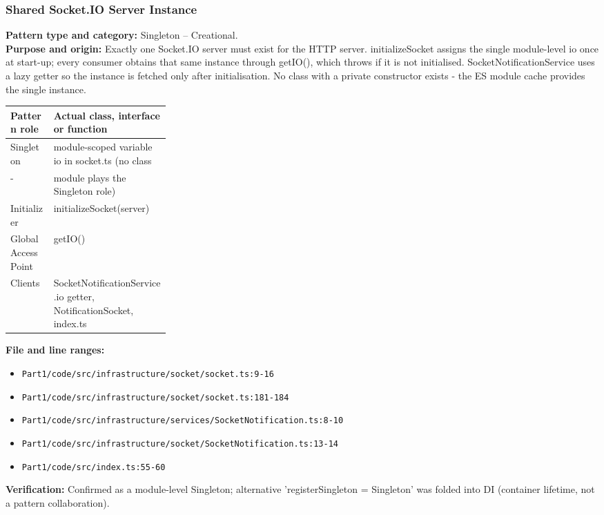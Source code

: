 \documentclass[11pt,a4paper]{article}
\begin{document}
\subsubsection*{Shared Socket.IO Server Instance}
\textbf{Pattern type and category:} Singleton -- Creational.\\
\textbf{Purpose and origin:} Exactly one Socket.IO server must exist for the HTTP server. initializeSocket assigns the single module-level io once at start-up; every consumer obtains that same instance through getIO(), which throws if it is not initialised. SocketNotificationService uses a lazy getter so the instance is fetched only after initialisation. No class with a private constructor exists - the ES module cache provides the single instance.

\noindent\begin{tabularx}{\linewidth}{@{}P{0.27\linewidth}Y@{}}
\toprule Pattern role & Actual class, interface or function \\ \midrule
Singleton & module-scoped variable io in socket.ts (no class \\
- & module plays the Singleton role) \\
Initializer & initializeSocket(server) \\
GlobalAccessPoint & getIO() \\
Clients & SocketNotificationService.io getter, NotificationSocket, index.ts \\
\bottomrule
\end{tabularx}

\noindent\textbf{File and line ranges:}\begin{itemize}\setlength\itemsep{0pt}\item \texttt{Part1/\allowbreak{}code/\allowbreak{}src/\allowbreak{}infrastructure/\allowbreak{}socket/\allowbreak{}socket.\allowbreak{}ts:9-16}\item \texttt{Part1/\allowbreak{}code/\allowbreak{}src/\allowbreak{}infrastructure/\allowbreak{}socket/\allowbreak{}socket.\allowbreak{}ts:181-184}\item \texttt{Part1/\allowbreak{}code/\allowbreak{}src/\allowbreak{}infrastructure/\allowbreak{}services/\allowbreak{}SocketNotification.\allowbreak{}ts:8-10}\item \texttt{Part1/\allowbreak{}code/\allowbreak{}src/\allowbreak{}infrastructure/\allowbreak{}socket/\allowbreak{}SocketNotification.\allowbreak{}ts:13-14}\item \texttt{Part1/\allowbreak{}code/\allowbreak{}src/\allowbreak{}index.\allowbreak{}ts:55-60}\end{itemize}
\noindent\textbf{Verification:} Confirmed as a module-level Singleton; alternative 'registerSingleton = Singleton' was folded into DI (container lifetime, not a pattern collaboration).
\end{document}
